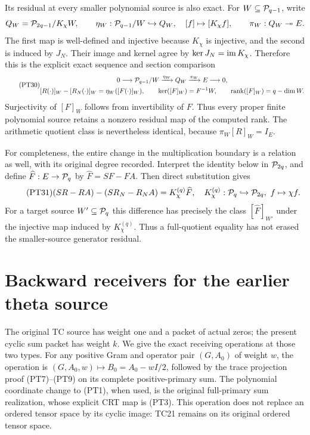 Its residual at every smaller polynomial source is also exact.
For \(W\subseteq\mathcal P_{q-1}\), write
\[
 Q_W=\mathcal P_{2q-1}/K_\chi W,\qquad
 \eta_W:\mathcal P_{q-1}/W\hookrightarrow Q_W,\quad
 [f]\mapsto[K_\chi f],\qquad
 \pi_W:Q_W\twoheadrightarrow E.
\]
The first map is well-defined and injective because \(K_\chi\)
is injective, and the second is induced by \(J_N\).
Their image and kernel agree by \(\ker J_N=\operatorname{im} K_\chi\).
Therefore this is the explicit exact sequence and section comparison
\begin{equation}\tag{PT30}
 \begin{gathered}
 0\longrightarrow\mathcal P_{q-1}/W\xrightarrow{\eta_W}Q_W
   \xrightarrow{\pi_W}E\longrightarrow0,\\
 [R(\cdot)]_W-[R_N(\cdot)]_W=\eta_W([F(\cdot)]_W),\qquad
 \ker([F]_W)=F^{-1}W,\qquad
 \operatorname{rank}([F]_W)=q-\dim W.
 \end{gathered}
\end{equation}
Surjectivity of \([F]_W\) follows from invertibility of \(F\).
Thus every proper finite polynomial source retains a nonzero
residual map of the computed rank. The arithmetic quotient class
is nevertheless identical, because \(\pi_W[R]_W=I_E\).

For completeness, the entire change in the multiplication boundary
is a relation as well, with its original degree recorded. Interpret
the identity below in \(\mathcal P_{2q}\), and define
\(\widehat F:E\to\mathcal P_q\) by \(\widehat F=SF-FA\).
Then direct substitution gives
\begin{equation}\tag{PT31}
 (SR-RA)-(SR_N-R_NA)=K_\chi^{(q)}\widehat F,
 \quad K_\chi^{(q)}:\mathcal P_q\hookrightarrow\mathcal P_{2q},\ f\mapsto\chi f.
\end{equation}
For a target source \(W'\subseteq\mathcal P_q\) this difference has
precisely the class \([\widehat F]_{W'}\) under the injective
map induced by \(K_\chi^{(q)}\). Thus a full-quotient equality
has not erased the smaller-source generator residual.

\section{Backward receivers for the earlier theta source}

The original TC source has weight one and a packet of actual zeros;
the present cyclic sum packet has weight \(k\). We give the exact
receiving operations at those two types. For any positive Gram and
operator pair \((G,A_0)\) of weight \(w\), the operation is
\((G,A_0,w)\mapsto B_0=A_0-wI/2\), followed by the trace
projection proof (PT7)--(PT9) on its complete positive-primary sum.
The polynomial coordinate change to (PT1), when used, is the
original full-primary sum realization, whose explicit CRT map is
(PT3). This operation does not replace an ordered tensor space by
its cyclic image: TC21 remains on its original ordered tensor space.

